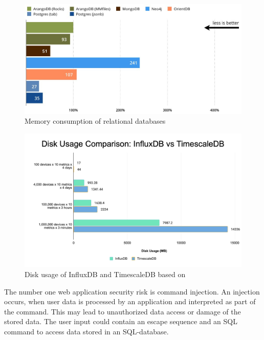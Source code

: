         \begin{figure}
            \centering
            \includegraphics[width=\textwidth]{latex/figures/mem_db.jpg}
            \caption[Memory consumption of relational databases]{Memory consumption of relational databases \cite{noauthor_benchmark_2018}}
            \label{fig:mem_db}
        \end{figure}
   
       \begin{figure}
                \includegraphics[width=\textwidth]{latex/figures/diskusage_influx_ts.png}
                \caption[Disk usage of InfluxDB and TimescaleDB]{Disk usage of InfluxDB and TimescaleDB based on \cite{freedman_timescaledb_2020}}
                \label{fig:disk_db}
        \end{figure}

        The number one web application security risk is command injection.
        An injection occurs, when user data is processed by an application and interpreted as part of the command. This may lead to unauthorized data access or damage of the stored data. 
        The user input could contain an escape sequence and an SQL command to access data stored in an SQL-database.\\
        
